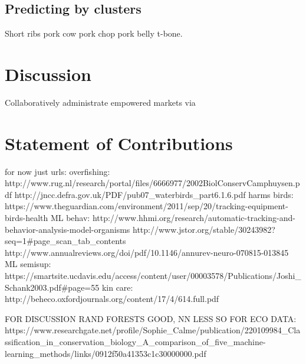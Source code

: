 \documentclass[10pt,conference]{IEEEtran}
\begin{document}
\subsection{Predicting by clusters}
    Short ribs pork cow pork chop pork belly t-bone. 

\section{Discussion}
	Collaboratively administrate empowered markets via

	
\section{Statement of Contributions}

    
 

for now just urls:
overfishing: http://www.rug.nl/research/portal/files/6666977/2002BiolConservCamphuysen.pdf
            http://jncc.defra.gov.uk/PDF/pub07_waterbirds_part6.1.6.pdf
harms birds: https://www.theguardian.com/environment/2011/sep/20/tracking-equipment-birds-health
ML behav: http://www.hhmi.org/research/automatic-tracking-and-behavior-analysis-model-organisms
            http://www.jstor.org/stable/30243982?seq=1#page_scan_tab_contents
            http://www.annualreviews.org/doi/pdf/10.1146/annurev-neuro-070815-013845
ML semisup: https://smartsite.ucdavis.edu/access/content/user/00003578/Publications/Joshi_Schank2003.pdf#page=55
kin care: http://beheco.oxfordjournals.org/content/17/4/614.full.pdf

FOR DISCUSSION RAND FORESTS GOOD, NN LESS SO FOR ECO DATA: https://www.researchgate.net/profile/Sophie_Calme/publication/220109984_Classification_in_conservation_biology_A_comparison_of_five_machine-learning_methods/links/0912f50a41353c1c30000000.pdf
\end{document}
